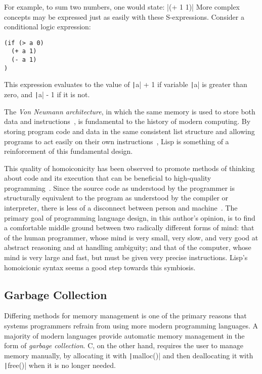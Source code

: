 \documentclass[11pt,draft]{article}
\theoremstyle{break}
\begin{document}
For example, to sum two numbers, one would state:
|(+ 1 1)|
More complex concepts may be expressed just as easily with these S-expressions. Consider a conditional logic expression:
\begin{verbatim}
(if (> a 0)
  (+ a 1)
  (- a 1)
)
\end{verbatim}
This expression evaluates to the value of \texttt|a| + 1 if variable \texttt|a| is greater than zero, and \texttt|a| - 1 if it is not.

The \textit{Von Neumann architecture}, in which the same memory is used to store both data and instructions~\cite{von1993first}, is fundamental to the history of modern computing. By storing program code and data in the same consistent list structure and allowing programs to act easily on their own instructions~\cite{Smith:1984:RSL:800017.800513}, Lisp is something of a reinforcement of this fundamental design.

This quality of homoiconicity has been observed to promote methods of thinking about code and its execution that can be beneficial to high-quality programming~\cite{sicp,raymond2003become}. Since the source code as understood by the programmer is structurally equivalent to the program as understood by the compiler or interpreter, there is less of a disconnect between person and machine~\cite{sicp}. The primary goal of programming language design, in this author's opinion, is to find a comfortable middle ground between two radically different forms of mind: that of the human programmer, whose mind is very small, very slow, and very good at abstract reasoning and at handling ambiguity; and that of the computer, whose mind is very large and fast, but must be given very precise instructions. Lisp's homoicionic syntax seems a good step towards this symbiosis.

\subsection{Garbage Collection}\label{subsec:gc}

Differing methods for memory management is one of the primary reasons that systems programmers refrain from using more modern programming languages. A majority of modern languages provide automatic memory management in the form of \textit{garbage collection}. C, on the other hand, requires the user to manage memory manually, by allocating it with \texttt|malloc()| and then deallocating it with \texttt|free()| when it is no longer needed.
\end{document}
